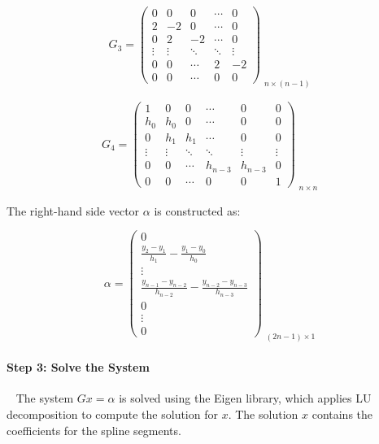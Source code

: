\documentclass{article}
\begin{document}
\[
G_3 =
\begin{pmatrix}
0 & 0 & 0 & \cdots & 0 \\
2 & -2 & 0 & \cdots & 0 \\
0 & 2 & -2 & \cdots & 0 \\
\vdots & \vdots & \ddots & \ddots & \vdots \\
0 & 0 & \cdots & 2 & -2 \\
0 & 0 & \cdots & 0 & 0
\end{pmatrix}_{\substack{\text{\(n\times(n-1)\)}}}
\]

\[
G_4 =
\begin{pmatrix}
1 & 0 & 0 & \cdots & 0 & 0\\
h_0 & h_0 & 0 & \cdots & 0 & 0\\
0 & h_1 & h_1 & \cdots & 0 & 0\\
\vdots & \vdots & \ddots & \ddots & \vdots & \vdots\\
0 & 0 & \cdots & h_{n-3} & h_{n-3} & 0 \\
0 & 0 & \cdots & 0 & 0 & 1
\end{pmatrix}_{\substack{\text{\(n\times n\)}}}
\]

The right-hand side vector \( \alpha \) is constructed as:

\[
\alpha =
\begin{pmatrix}
0 \\
\frac{y_2-y_1}{h_1}-\frac{y_1-y_0}{h_0} \\
\vdots \\
\frac{y_{n-1}-y_{n-2}}{h_{n-2}}-\frac{y_{n-2}-y_{n-3}}{h_{n-3}} \\
0 \\
\vdots \\
0
\end{pmatrix}_{\substack{\text{\((2n-1)\times1\)}}}
\]

\paragraph{Step 3: Solve the System}~{}\newline
The system \( Gx = \alpha \) is solved using the Eigen library, which applies LU decomposition to compute the solution for \( x \). The solution \( x \) contains the coefficients for the spline segments.
\end{document}
